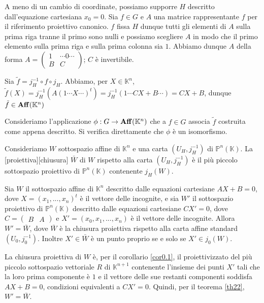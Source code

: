 \Proof A meno di un cambio di coordinate, possiamo supporre $H$ descritto dall'equazione cartesiana $x_0 = 0$. Sia $f \in G$ e $A$ una matrice rappresentante $f$ per il riferimento proiettivo canonico. $f$ fissa $H$ dunque tutti gli elementi di $A$ sulla prima riga tranne il primo sono nulli e possiamo scegliere $A$ in modo che il primo elemento sulla prima riga e sulla prima colonna sia $1$. Abbiamo dunque $A$ della forma $A = \left ( \begin{array}{c|c} 1 & \cdots 0 \cdots\\ \hline B & C \end{array} \right )$; $C$ \`e invertibile.
	\par Sia $\tilde{f} = j_H^{-1} \circ f \circ j_H$. Abbiamo, per $X \in \mathbb{K}^n$, $\tilde{f}(X) = j_H^{-1}(A (1 \cdots X \cdots)^t) = j_H^{-1}(1 \cdots CX + B \cdots) = CX + B$, dunque $\tilde{f} \in \mathbf{Aff}(\mathbb{K}^n)$
	\par Consideriamo l'applicazione $\phi: G \rightarrow \mathbf{Aff}(\mathbb{K}^n)$ che a $f \in G$ associa $\tilde{f}$ costruita come appena descritto. Si verifica direttamente che $\phi$ \`e un isomorfismo. \EndProof
\begin{Definition}\label{deftop5}
	Consideriamo $W$ sottospazio affine di $\mathbb{K}^n$ e una carta $(U_H, j_H^{-1})$ di $\mathbb{P}^n(\mathbb{K})$. La [proiettiva][chiusura] $\bar{W}$ di $W$ rispetto alla carta $(U_H, j_H^{-1})$ \`e il pi\`u piccolo sottospazio proiettivo di $\mathbb{P}^n(\mathbb{K})$ contenente $j_H(W)$.
\end{Definition}
\begin{Theorem}\label{thtop7}
	Sia $W$ il sottospazio affine di $\mathbb{K}^n$ descritto dalle equazioni cartesiane $AX + B = 0$, dove $X = (x_1, ..., x_n)^t$ \`e il vettore delle incognite, e sia $W'$ il sottospazio proiettivo di $\mathbb{P}^n(\mathbb{K})$ descritto dalle equazioni cartesiane $CX' = 0$, dove $C = \left ( \begin{array}{c|c} B & A \end{array} \right )$ e $X' = (x_0, x_1, ..., x_n)$ \`e il vettore delle incognite. Allora $W' = \bar{W}$, dove $\bar{W}$ \`e la chiusura proiettiva rispetto alla carta affine standard $(U_0,j_0^{-1})$. Inoltre $X' \in \bar{W}$ \`e un punto proprio se e solo se $X' \in j_0(W)$.
\end{Theorem}
\Proof La chiusura proiettiva di $W$ \`e, per il corollario \ref{cor0.1}, il proiettivizzato del pi\`u piccolo sottospazio vettoriale $R$ di $\mathbb{K}^{n + 1}$ contenente l'insieme dei punti $X'$ tali che la loro prima componente \`e $1$ e il vettore delle sue restanti componenti soddisfa $AX + B = 0$, condizioni equivalenti a $CX' = 0$. Quindi, per il teorema \ref{th22}, $W' = \bar{W}$.

